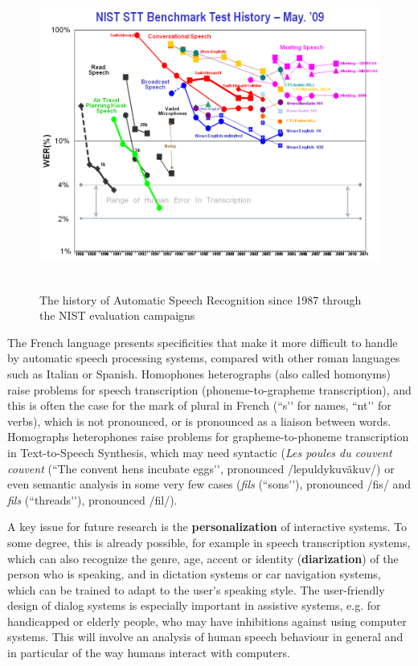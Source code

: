 \documentclass[]{../metanetpaper}
\begin{document}
\begin{multicols}{2}
\begin{figure}[!ht]
\begin{center}
  \includegraphics[height=4.0in]{../_media/french/french_pix8_speech_reco_nist.png}
  \caption{The history of Automatic Speech Recognition since 1987 through the NIST evaluation campaigns~\cite{speechreconist}}
  \label{fig:nistreco}
\end{center}
\end{figure}

The French language presents specificities that make it more difficult
to handle by automatic speech processing systems, compared with other
roman languages such as Italian or Spanish. Homophones heterographs
(also called homonyms) raise problems for speech transcription
(phoneme-to-grapheme transcription), and this is often the case for
the mark of plural in French (``s{\mbox '}{\mbox '} for names, ``nt{\mbox '}{\mbox '} for verbs), which is
not pronounced, or is pronounced as a liaison between
words. Homographs heterophones raise problems for grapheme-to-phoneme
transcription in Text-to-Speech Synthesis, which may need syntactic
({\em Les poules du couvent couvent} (``The convent hens incubate eggs{\mbox '}{\mbox '},
pronounced /lepuldykuvãkuv/) or even semantic analysis in some very
few cases ({\em fils} (``sons{\mbox '}{\mbox '}), pronounced /fis/ and {\em fils} (``threads{\mbox '}{\mbox '}),
pronounced /fil/).

A key issue for future research is the {\bf personalization} of interactive
systems. To some degree, this is already possible, for example in
speech transcription systems, which can also recognize the genre, age,
accent or identity ({\bf diarization}) of the person who is speaking, and in
dictation systems or car navigation systems, which can be trained to
adapt to the user{\mbox '}s speaking style. The user-friendly design of dialog
systems is especially important in assistive systems, e.g. for
handicapped or elderly people, who may have inhibitions against using
computer systems. This will involve an analysis of human speech
behaviour in general and in particular of the way humans interact with
computers.


\end{multicols}
\end{document}
